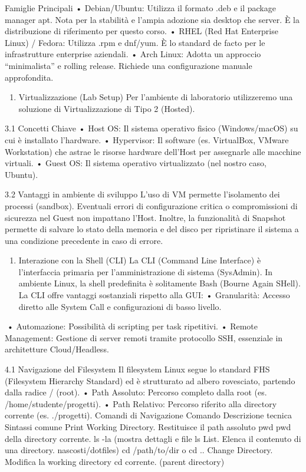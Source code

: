 \documentclass[11pt,a4paper]{article}
\providecommand{\tightlist}{%
  \setlength{\itemsep}{0pt}\setlength{\parskip}{0pt}}
\begin{document}
Famiglie Principali • Debian/Ubuntu: Utilizza il formato .deb e il
package manager apt. Nota per la stabilità e l'ampia adozione sia
desktop che server. È la distribuzione di riferimento per questo corso.
• RHEL (Red Hat Enterprise Linux) / Fedora: Utilizza .rpm e dnf/yum. È
lo standard de facto per le infrastrutture enterprise aziendali. • Arch
Linux: Adotta un approccio ``minimalista'' e rolling release. Richiede
una configurazione manuale approfondita.

\begin{enumerate}
\def\labelenumi{\arabic{enumi}.}
\setcounter{enumi}{2}
\tightlist
\item
  Virtualizzazione (Lab Setup) Per l'ambiente di laboratorio
  utilizzeremo una soluzione di Virtualizzazione di Tipo 2 (Hosted).
\end{enumerate}

3.1 Concetti Chiave • Host OS: Il sistema operativo fisico
(Windows/macOS) su cui è installato l'hardware. • Hypervisor: Il
software (es. VirtualBox, VMware Workstation) che astrae le risorse
hardware dell'Host per assegnarle alle macchine virtuali. • Guest OS: Il
sistema operativo virtualizzato (nel nostro caso, Ubuntu).

3.2 Vantaggi in ambiente di sviluppo L'uso di VM permette l'isolamento
dei processi (sandbox). Eventuali errori di configurazione critica o
compromissioni di sicurezza nel Guest non impattano l'Host. Inoltre, la
funzionalità di Snapshot permette di salvare lo stato della memoria e
del disco per ripristinare il sistema a una condizione precedente in
caso di errore.

\begin{enumerate}
\def\labelenumi{\arabic{enumi}.}
\setcounter{enumi}{3}
\tightlist
\item
  Interazione con la Shell (CLI) La CLI (Command Line Interface) è
  l'interfaccia primaria per l'amministrazione di sistema (SysAdmin). In
  ambiente Linux, la shell predefinita è solitamente Bash (Bourne Again
  SHell). La CLI offre vantaggi sostanziali rispetto alla GUI: •
  Granularità: Accesso diretto alle System Call e configurazioni di
  basso livello.
\end{enumerate}

• Automazione: Possibilità di scripting per task ripetitivi. • Remote
Management: Gestione di server remoti tramite protocollo SSH, essenziale
in architetture Cloud/Headless.

4.1 Navigazione del Filesystem Il filesystem Linux segue lo standard FHS
(Filesystem Hierarchy Standard) ed è strutturato ad albero rovesciato,
partendo dalla radice / (root). • Path Assoluto: Percorso completo dalla
root (es. /home/studente/progetti). • Path Relativo: Percorso riferito
alla directory corrente (es. ./progetti). Comandi di Navigazione Comando
Descrizione tecnica Sintassi comune Print Working Directory. Restituisce
il path assoluto pwd pwd della directory corrente. ls -la (mostra
dettagli e file ls List. Elenca il contenuto di una directory.
nascosti/dotfiles) cd /path/to/dir o cd .. Change Directory. Modifica la
working directory cd corrente. (parent directory)
\end{document}

